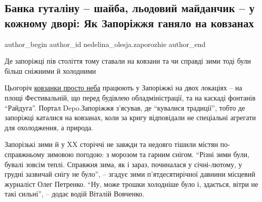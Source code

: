  
 
 
 
 
\subsection{Банка гуталіну – шайба, льодовий майданчик – у кожному дворі: Як Запоріжжя ганяло на ковзанах}
\label{sec:09_01_2022.stz.news.ua.depo.1.zaporozhie}

\ifcmt
 author_begin
   author_id nedelina_olesja.zaporozhie
 author_end
\fi

\begin{zznagolos}
Де запоріжці пів століття тому ставали на ковзани та чи справді зими тоді були
більш сніжними й холодними	
\end{zznagolos}

Цьогоріч \href{https://zp.depo.ua/ukr/zp/budinochok-svyatogo-mikolaya-ta-kovzanka-u-zaporizhzhi-na-rayduzi-vidkrilosya-novorichne-mistechko-fotoreportazh-202112191403954}{ковзанки просто неба} працюють у Запоріжжі на двох локаціях – на площі
Фестивальній, що перед будівлею обладміністрації, та на каскаді фонтанів
\enquote{Райдуга}. Портал Depo.Запоріжжя з’ясував, де \enquote{кувалися традиції}, тобто де
запоріжці каталися на ковзанах, коли за кригу відповідали не спеціальні
агрегати для охолодження, а природа.  


Запорізькі зими й у XX сторіччі не завжди та недовго тішили містян
по-справжньому зимовою погодою: з морозом та гарним снігом. \enquote{Різні зими були,
бувалі зовсім теплі. Справжня зима, як і зараз, починалася у січні-лютому, у
грудні зазвичай снігу не було}, – згадує зими п’ятдесятирічної давнини місцевий
журналіст Олег Петренко. \enquote{Ну, може трошки холодніше було і, здається, вітри не
такі сильні}, – додає водій Віталій Вовченко.

